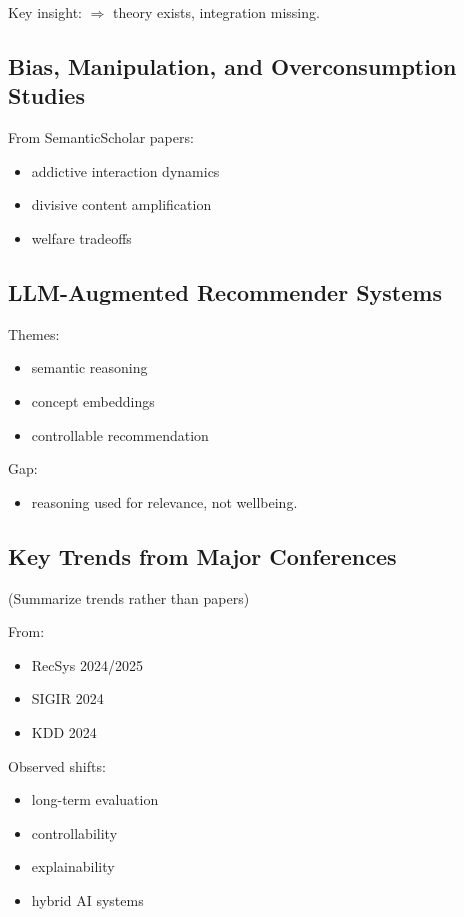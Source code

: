 \documentclass[lettersize,journal]{IEEEtran}
\begin{document}
Key insight:  
$\Rightarrow$ theory exists, integration missing.

\subsection{Bias, Manipulation, and Overconsumption Studies}

From SemanticScholar papers:

\begin{itemize}
    \item addictive interaction dynamics
    \item divisive content amplification
    \item welfare tradeoffs    
\end{itemize}    

\subsection{LLM-Augmented Recommender Systems}

Themes:

\begin{itemize}
    \item semantic reasoning    
    \item concept embeddings
    \item controllable recommendation
\end{itemize}    

Gap:

\begin{itemize}
    \item reasoning used for relevance, not wellbeing.
\end{itemize}
    
\subsection{Key Trends from Major Conferences}

(Summarize trends rather than papers)

From:

\begin{itemize}
    \item RecSys 2024/2025
    \item SIGIR 2024
    \item KDD 2024
\end{itemize}
    

Observed shifts:

\begin{itemize}
    \item long-term evaluation
    \item controllability
    \item explainability
    \item hybrid AI systems
\end{itemize}
\end{document}
